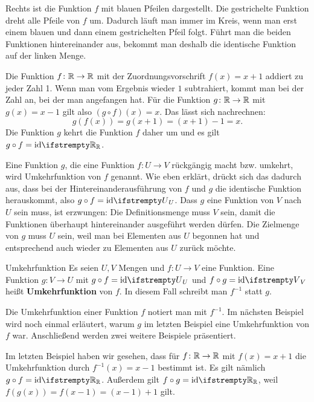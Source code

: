 \documentclass[../../main.tex]{subfiles}
\begin{document}
Rechts ist die Funktion $f$ mit blauen Pfeilen dargestellt. Die gestrichelte Funktion dreht alle Pfeile von $f$ um. Dadurch läuft man immer im Kreis, wenn man erst einem blauen und dann einem gestrichelten Pfeil folgt. Führt man die beiden Funktionen hintereinander aus, bekommt man deshalb die identische Funktion auf der linken Menge.

\begin{example}{}
    Die Funktion $f\colon\mathbb{R}\rightarrow\mathbb{R}$ mit der Zuordnungsvorschrift $f(x)=x+1$ addiert zu jeder Zahl 1. Wenn man vom Ergebnis wieder $1$ subtrahiert, kommt man bei der Zahl an, bei der man angefangen hat. Für die Funktion $g\colon\mathbb{R}\rightarrow\mathbb{R}$ mit $g(x)=x-1$ gilt also $(g\circ f)(x)=x$. Das lässt sich nachrechnen:
    \[g(f(x))=g(x+1)=(x+1)-1=x.\]
    Die Funktion $g$ kehrt die Funktion $f$ daher um und es gilt $g\circ f=\ident[\Real]$.
\end{example}

Eine Funktion $g$, die eine Funktion $f\colon U\rightarrow V$ rückgängig macht bzw. umkehrt, wird Umkehrfunktion von $f$ genannt. Wie eben erklärt, drückt sich das dadurch aus, dass bei der Hintereinanderausführung von $f$ und $g$ die identische Funktion herauskommt, also $g\circ f=\ident[U]$. Dass $g$ eine Funktion von $V$ nach $U$ sein muss, ist erzwungen: Die Definitionsmenge muss $V$ sein, damit die Funktionen überhaupt hintereinander ausgeführt werden dürfen. Die Zielmenge von $g$ muss $U$ sein, weil man bei Elementen aus $U$ begonnen hat und entsprechend auch wieder zu Elementen aus $U$ zurück möchte.

\begin{definition}{Umkehrfunktion}
    Es seien $U,V$ Mengen und $f\colon U\rightarrow V$ eine Funktion. Eine Funktion $g\colon V\rightarrow U$ mit $g\circ f=\ident[U]$ und $f\circ g=\ident[V]$ heißt \textbf{Umkehrfunktion} von $f$. In diesem Fall schreibt man $f^{-1}$ statt $g$.
\end{definition}

Die Umkehrfunktion einer Funktion $f$ notiert man mit $f^{-1}$. Im nächsten Beispiel wird noch einmal erläutert, warum $g$ im letzten Beispiel eine Umkehrfunktion von $f$ war. Anschließend werden zwei weitere Beispiele präsentiert.

\begin{example}{}
    Im letzten Beispiel haben wir gesehen, dass für $f\colon\mathbb{R}\rightarrow\mathbb{R}$ mit $f(x)=x+1$ die Umkehrfunktion durch $f^{-1}(x)=x-1$ bestimmt ist. Es gilt nämlich $g\circ f=\ident[\Real]$. Außerdem gilt $f\circ g=\ident[\Real]$, weil $f(g(x))=f(x-1)=(x-1)+1$ gilt.
\end{example}
\end{document}
